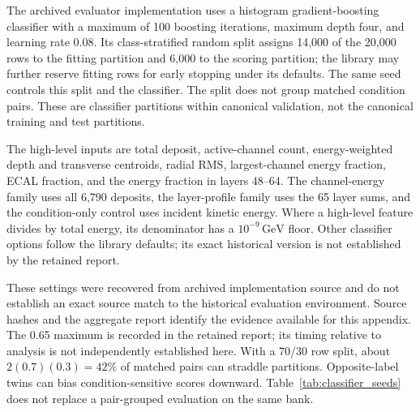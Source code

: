 \documentclass[11pt]{article}
\newcommand{\GeV}{\,\mathrm{GeV}}
\begin{document}
The archived evaluator implementation uses a histogram gradient-boosting classifier with a maximum of 100 boosting iterations, maximum depth four, and learning rate 0.08. Its class-stratified random split assigns 14,000 of the 20,000 rows to the fitting partition and 6,000 to the scoring partition; the library may further reserve fitting rows for early stopping under its defaults. The same seed controls this split and the classifier. The split does not group matched condition pairs. These are classifier partitions within canonical validation, not the canonical training and test partitions.

The high-level inputs are total deposit, active-channel count, energy-weighted depth and transverse centroids, radial RMS, largest-channel energy fraction, ECAL fraction, and the energy fraction in layers 48--64. The channel-energy family uses all 6,790 deposits, the layer-profile family uses the 65 layer sums, and the condition-only control uses incident kinetic energy. Where a high-level feature divides by total energy, its denominator has a $10^{-9}\GeV$ floor. Other classifier options follow the library defaults; its exact historical version is not established by the retained report.

These settings were recovered from archived implementation source and do not establish an exact source match to the historical evaluation environment. Source hashes and the aggregate report identify the evidence available for this appendix. The 0.65 maximum is recorded in the retained report; its timing relative to analysis is not independently established here. With a 70/30 row split, about $2(0.7)(0.3)=42\%$ of matched pairs can straddle partitions. Opposite-label twins can bias condition-sensitive scores downward. Table~\ref{tab:classifier_seeds} does not replace a pair-grouped evaluation on the same bank.

\clearpage
\printbibliography
\end{document}
